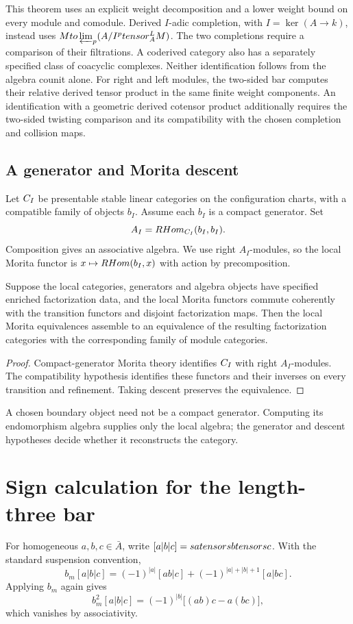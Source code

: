 This theorem uses an explicit weight decomposition and a lower weight bound on every module and comodule.
Derived $I$-adic completion, with $I=\ker(A\to k)$, instead uses
$M\to\varprojlim_p(A/I^p\otimes_A^{\mathbb L}M)$.
The two completions require a comparison of their filtrations.
A coderived category also has a separately specified class of coacyclic complexes.
Neither identification follows from the algebra counit alone.
For right and left modules, the two-sided bar computes their relative derived tensor product
in the same finite weight components.
An identification with a geometric derived cotensor product additionally requires
the two-sided twisting comparison and its compatibility with the chosen completion and collision maps.

\subsection{A generator and Morita descent}
Let $\Ccal_I$ be presentable stable linear categories on the configuration charts,
with a compatible family of objects $b_I$.
Assume each $b_I$ is a compact generator. Set
\[
 A_I=\RHom_{\Ccal_I}(b_I,b_I).
\]
Composition gives an associative algebra. We use right $A_I$-modules, so the local
Morita functor is $x\mapsto\RHom(b_I,x)$ with action by precomposition.

\begin{theorem}
Suppose the local categories, generators and algebra objects have specified
enriched factorization data, and the local Morita functors commute coherently
with the transition functors and disjoint factorization maps.
Then the local Morita equivalences assemble to an equivalence of the resulting
factorization categories with the corresponding family of module categories.
\end{theorem}
\begin{proof}
Compact-generator Morita theory identifies $\Ccal_I$ with right $A_I$-modules.
The compatibility hypothesis identifies these functors and their inverses on
every transition and refinement. Taking descent preserves the equivalence.
\end{proof}

A chosen boundary object need not be a compact generator.
Computing its endomorphism algebra supplies only the local algebra; the generator
and descent hypotheses decide whether it reconstructs the category.

\section{Sign calculation for the length-three bar}
For homogeneous $a,b,c\in\bar A$, write $[a|b|c]=sa\tensor sb\tensor sc$. With the standard suspension convention,
\[
 b_m[a|b|c]
 =(-1)^{|a|}[ab|c]
 +(-1)^{|a|+|b|+1}[a|bc].
\]
Applying $b_m$ again gives
\[
 b_m^2[a|b|c]
 =(-1)^{|b|}\bigl[(ab)c-a(bc)\bigr],
\]
which vanishes by associativity.

